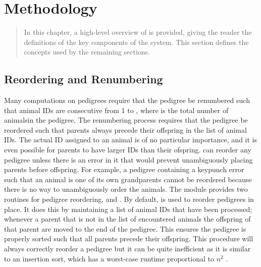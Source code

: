 \chapter{Methodology}
\label{cha:methodology}
\begin{quote}
In this chapter, a high-level overview of \PYPEDAL{} is provided, giving
the reader the definitions of the key components of the system. This section
defines the concepts used by the remaining sections.
\end{quote}
\section{Reordering and Renumbering}
\label{sec:methodology-reordering-and-renumbering}
Many computations on pedigrees require that the pedigree be renumbered such that animal IDs are consecutive from 1 to , where  is the total number of animalsin the pedigree.  The renumbering process requires that the pedigree be reordered such that parents always precede their offspring in the list of animal IDs.  The actual ID assigned to an animal is of no particular importance, and it is even possible for parents to have larger IDs than their ofspring.  \PyPedal{} can reorder any pedigree unless there is an error in it that would prevent unambiguously placing parents before offspring.  For example, a pedigree containing a keypunch error such that an animal is one of its own grandparents cannot be reordered because there is no way to unambiguously order the animals.  The  module provides two routines for pedigree reordering,  and .  By default,  is used to reorder pedigrees in place.  It does this by maintaining a list of animal IDs that have been processed; whenever a parent that is not in the  list of encountered animals the offspring of that parent are moved to the end of the pedigree.  This ensures the pedigree is properly sorted such that all parents precede their offspring.  This procedure will always correctly reorder a pedigree but it can be quite inefficient as it is similar to an insertion sort, which has a worst-case runtime proportional to $n^{2}$ \cite{Cormen2003}.

